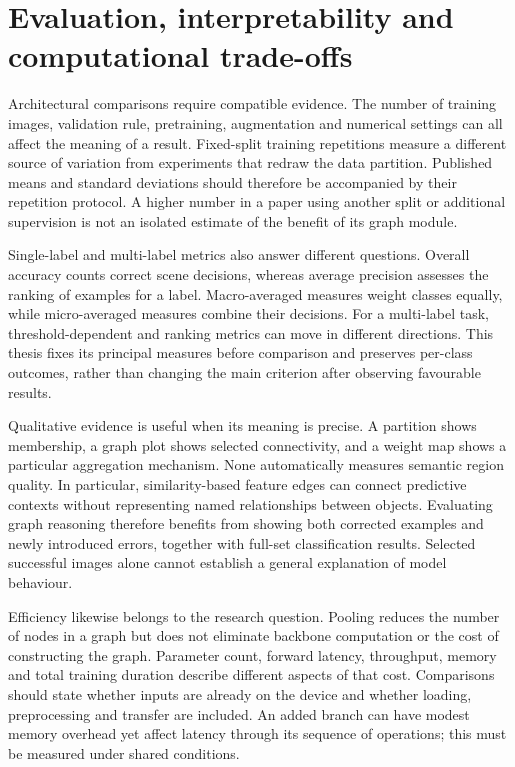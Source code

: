 \section{Evaluation, interpretability and computational trade-offs}

Architectural comparisons require compatible evidence. The number of training
images, validation rule, pretraining, augmentation and numerical settings
can all affect the meaning of a result. Fixed-split training repetitions
measure a different source of variation from experiments that redraw the
data partition. Published means and standard deviations should therefore
be accompanied by their repetition protocol. A higher number in a paper
using another split or additional supervision is not an isolated estimate
of the benefit of its graph module.

Single-label and multi-label metrics also answer different questions. Overall
accuracy counts correct scene decisions, whereas average precision assesses
the ranking of examples for a label. Macro-averaged measures weight classes
equally, while micro-averaged measures combine their decisions. For a
multi-label task, threshold-dependent and ranking metrics can move in
different directions. This thesis fixes its principal measures before
comparison and preserves per-class outcomes, rather than changing the main
criterion after observing favourable results.

Qualitative evidence is useful when its meaning is precise. A partition
shows membership, a graph plot shows selected connectivity, and a weight
map shows a particular aggregation mechanism. None automatically measures
semantic region quality. In particular, similarity-based feature edges
can connect predictive contexts without representing named relationships
between objects. Evaluating graph reasoning therefore benefits from showing
both corrected examples and newly introduced errors, together with full-set
classification results. Selected successful images alone cannot establish
a general explanation of model behaviour.

Efficiency likewise belongs to the research question. Pooling reduces the
number of nodes in a graph but does not eliminate backbone computation or
the cost of constructing the graph. Parameter count, forward latency,
throughput, memory and total training duration describe different aspects
of that cost. Comparisons should state whether inputs are already on the
device and whether loading, preprocessing and transfer are included. An
added branch can have modest memory overhead yet affect latency through
its sequence of operations; this must be measured under shared conditions.

